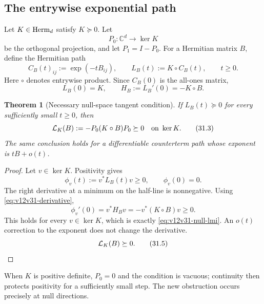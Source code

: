 \documentclass[11pt]{article}
\newtheorem{theorem}{Theorem}[section]
\theoremstyle{remark}
\begin{document}
\subsection{The entrywise exponential path}

Let \(K\in{\rm Herm}_d\) satisfy \(K\succeq0\).  Let
\[
 P_0:{\mathbb C}^d\longrightarrow\ker K
\]
be the orthogonal projection, and let \(P_1=I-P_0\).  For a Hermitian
matrix \(B\), define the Hermitian path
\begin{equation}
 C_B(t)_{ij}:=\exp(-tB_{ij}),
 \qquad
 L_B(t):=K\circ C_B(t),\qquad t\geq0.             \tag{31.1}
\end{equation}
Here \(\circ\) denotes entrywise product.  Since
\(C_B(0)\) is the all-ones matrix,
\[
 L_B(0)=K,\qquad
 H_B:=L_B'(0)=-K\circ B.                          \tag{31.2}
\]

\begin{theorem}[Necessary null-space tangent condition]
\label{thm:v12v31-tangent-necessary}
If \(L_B(t)\succeq0\) for every sufficiently small \(t\geq0\), then
\begin{equation}
 {\cal L}_K(B):=-P_0(K\circ B)P_0\succeq0
 \quad\text{on }\ker K.                           \tag{31.3}
\end{equation}
The same conclusion holds for a differentiable counterterm path
whose exponent is \(tB+o(t)\).
\end{theorem}

\begin{proof}
Let \(v\in\ker K\).  Positivity gives
\[
 \phi_v(t):=v^*L_B(t)v\geq0,\qquad \phi_v(0)=0.
\]
The right derivative at a minimum on the half-line is nonnegative.
Using \eqref{eq:v12v31-derivative},
\begin{equation}
 \phi_v'(0)
 =
 v^*H_Bv
 =
 -v^*(K\circ B)v\geq0.                            \tag{31.4}
 \label{eq:v12v31-derivative}
\end{equation}
This holds for every \(v\in\ker K\), which is exactly
\eqref{eq:v12v31-null-lmi}.  An \(o(t)\) correction to the exponent
does not change the derivative.
\begin{equation}
 {\cal L}_K(B)\succeq0.                           \tag{31.5}
 \label{eq:v12v31-null-lmi}
\end{equation}
\end{proof}

When \(K\) is positive definite, \(P_0=0\) and the condition is
vacuous; continuity then protects positivity for a sufficiently
small step.  The new obstruction occurs precisely at null
directions.
\end{document}
